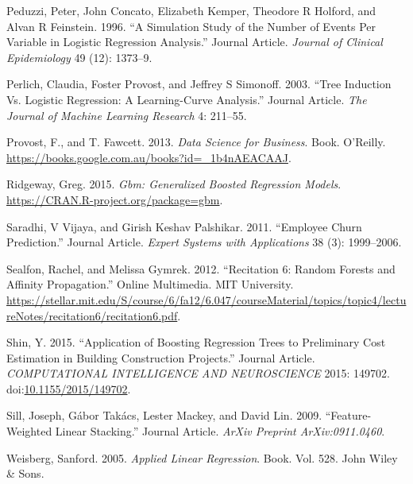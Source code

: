 \documentclass[]{elsarticle} %
\begin{document}
\hypertarget{ref-Peduzzi1996}{}
Peduzzi, Peter, John Concato, Elizabeth Kemper, Theodore R Holford, and
Alvan R Feinstein. 1996. ``A Simulation Study of the Number of Events
Per Variable in Logistic Regression Analysis.'' Journal Article.
\emph{Journal of Clinical Epidemiology} 49 (12): 1373--9.

\hypertarget{ref-Perlich2003}{}
Perlich, Claudia, Foster Provost, and Jeffrey S Simonoff. 2003. ``Tree
Induction Vs. Logistic Regression: A Learning-Curve Analysis.'' Journal
Article. \emph{The Journal of Machine Learning Research} 4: 211--55.

\hypertarget{ref-Provost2013}{}
Provost, F., and T. Fawcett. 2013. \emph{Data Science for Business}.
Book. O'Reilly. \url{https://books.google.com.au/books?id=_1b4nAEACAAJ}.

\hypertarget{ref-gbm}{}
Ridgeway, Greg. 2015. \emph{Gbm: Generalized Boosted Regression Models}.
\url{https://CRAN.R-project.org/package=gbm}.

\hypertarget{ref-Saradhi2011}{}
Saradhi, V Vijaya, and Girish Keshav Palshikar. 2011. ``Employee Churn
Prediction.'' Journal Article. \emph{Expert Systems with Applications}
38 (3): 1999--2006.

\hypertarget{ref-Sealfon2012}{}
Sealfon, Rachel, and Melissa Gymrek. 2012. ``Recitation 6: Random
Forests and Affinity Propagation.'' Online Multimedia. MIT University.
\url{https://stellar.mit.edu/S/course/6/fa12/6.047/courseMaterial/topics/topic4/lectureNotes/recitation6/recitation6.pdf}.

\hypertarget{ref-Shin2015}{}
Shin, Y. 2015. ``Application of Boosting Regression Trees to Preliminary
Cost Estimation in Building Construction Projects.'' Journal Article.
\emph{COMPUTATIONAL INTELLIGENCE AND NEUROSCIENCE} 2015: 149702.
doi:\href{https://doi.org/10.1155/2015/149702}{10.1155/2015/149702}.

\hypertarget{ref-Sill2009}{}
Sill, Joseph, Gábor Takács, Lester Mackey, and David Lin. 2009.
``Feature-Weighted Linear Stacking.'' Journal Article. \emph{ArXiv
Preprint ArXiv:0911.0460}.

\hypertarget{ref-Weisberg2005}{}
Weisberg, Sanford. 2005. \emph{Applied Linear Regression}. Book. Vol.
528. John Wiley \& Sons.
\end{document}
